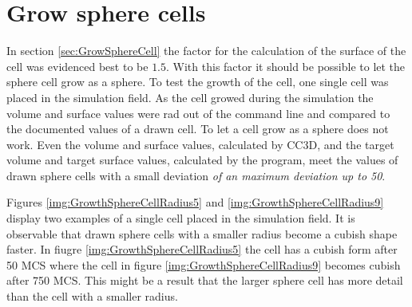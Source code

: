 \section{Grow sphere cells}
In section \ref{sec:GrowSphereCell} the factor for the calculation of the surface of the cell was evidenced best to be $1.5$. With this factor it should be possible to let the sphere cell grow as a sphere. To test the growth of the cell, one single cell was placed in the simulation field. As the cell growed during the simulation the volume and surface values were rad out of the command line and compared to the documented values of a drawn cell. \newline
To let a cell grow as a sphere does not work. Even the volume and surface values, calculated by \ac{CC3D}, and the target volume and target surface values, calculated by the program, meet the values of drawn sphere cells with a small deviation \textit{of an maximum deviation up to 50}.

Figures \ref{img:GrowthSphereCellRadius5} and \ref{img:GrowthSphereCellRadius9} display two examples of a single cell placed in the simulation field. It is observable that drawn sphere cells with a smaller radius become a cubish shape faster. In fiugre \ref{img:GrowthSphereCellRadius5} the cell has a cubish form after 50 \ac{MCS} where the cell in figure \ref{img:GrowthSphereCellRadius9} becomes cubish after 750 \ac{MCS}. This might be a result that the larger sphere cell has more detail than the cell with a smaller radius.

